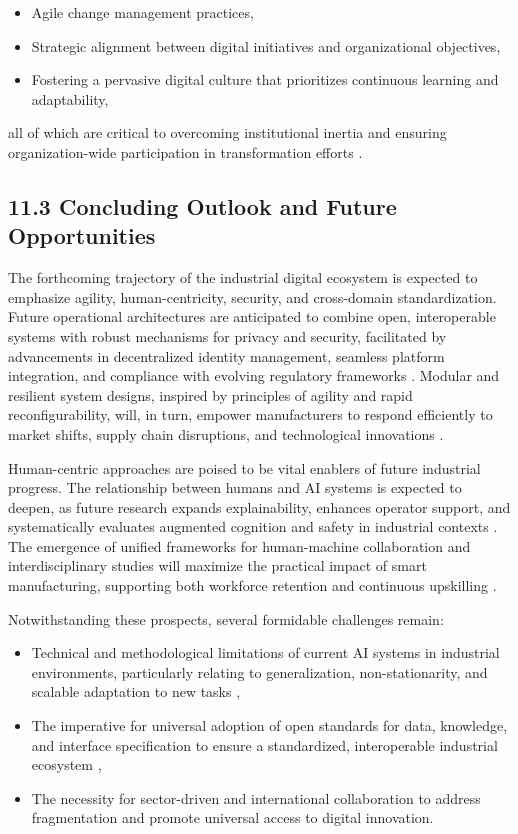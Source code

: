 \documentclass[11pt]{article}
\begin{document}
\begin{itemize}
    \item Agile change management practices,
    \item Strategic alignment between digital initiatives and organizational objectives,
    \item Fostering a pervasive digital culture that prioritizes continuous learning and adaptability,
\end{itemize}

all of which are critical to overcoming institutional inertia and ensuring organization-wide participation in transformation efforts \cite{ref25}\cite{ref31}\cite{ref35}.

\subsection{11.3 Concluding Outlook and Future Opportunities}

The forthcoming trajectory of the industrial digital ecosystem is expected to emphasize agility, human-centricity, security, and cross-domain standardization. Future operational architectures are anticipated to combine open, interoperable systems with robust mechanisms for privacy and security, facilitated by advancements in decentralized identity management, seamless platform integration, and compliance with evolving regulatory frameworks \cite{ref41}\cite{ref86}\cite{ref93}. Modular and resilient system designs, inspired by principles of agility and rapid reconfigurability, will, in turn, empower manufacturers to respond efficiently to market shifts, supply chain disruptions, and technological innovations \cite{ref3}\cite{ref68}.

Human-centric approaches are poised to be vital enablers of future industrial progress. The relationship between humans and AI systems is expected to deepen, as future research expands explainability, enhances operator support, and systematically evaluates augmented cognition and safety in industrial contexts \cite{ref45}\cite{ref83}. The emergence of unified frameworks for human-machine collaboration and interdisciplinary studies will maximize the practical impact of smart manufacturing, supporting both workforce retention and continuous upskilling \cite{ref86}\cite{ref94}.

Notwithstanding these prospects, several formidable challenges remain:

\begin{itemize}
    \item Technical and methodological limitations of current AI systems in industrial environments, particularly relating to generalization, non-stationarity, and scalable adaptation to new tasks \cite{ref19}\cite{ref20}\cite{ref54},
    \item The imperative for universal adoption of open standards for data, knowledge, and interface specification to ensure a standardized, interoperable industrial ecosystem \cite{ref13}\cite{ref86},
    \item The necessity for sector-driven and international collaboration to address fragmentation and promote universal access to digital innovation.
\end{itemize}
\end{document}
